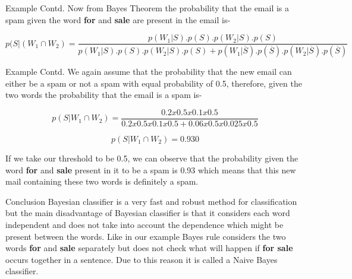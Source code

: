 \begin{frame}{Example Contd.}
Now from Bayes Theorem the probability that the email is a spam given the word \textbf{for} and \textbf{sale} are present in the email is-

$$
p(S|(W_1 \cap W_2) = \dfrac{p(W_1|S).p(S).p(W_2|S).p(S)}{p(W_1|S).p(S).p(W_2|S).p(S) + p(W_1|\overline{S}).p(\overline{S}).p(W_2|\overline{S}).p(\overline{S})}
$$
\end{frame}

\begin{frame}{Example Contd.}
We again assume that the probability that the new email can either be a spam or not a spam with equal probability of 0.5, therefore, given the two words the probability that the email is a spam is-

$$
p(S|W_1 \cap W_2) = \dfrac{0.2 x 0.5 x 0.1 x 0.5}{0.2 x 0.5 x 0.1 x 0.5 + 0.06 x 0.5 x 0.025 x 0.5}
$$

$$
p(S|W_1 \cap W_2) = 0.930
$$

If we take our threshold to be 0.5, we can observe that the probability given the word \textbf{for} and \textbf{sale} present in it to be a spam is 0.93 which means that this new mail containing these two words is definitely a spam.

\end{frame}

\begin{frame}{Conclusion}
Bayesian classifier is a very fast and robust method for classification but the main disadvantage of Bayesian classifier is that it considers each word independent and does not take into account the dependence which might be present between the words. Like in our example Bayes rule considers the two words \textbf{for} and \textbf{sale} separately but does not check what will happen if \textbf{for sale} occurs together in a sentence. Due to this reason it is called a Naive Bayes classifier.
    
\end{frame}
